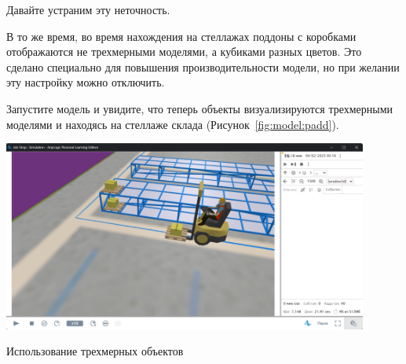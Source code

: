 Давайте устраним эту неточность.\par
В то же время, во время нахождения на стеллажах поддоны с коробками
отображаются не трехмерными моделями, а кубиками разных цветов. Это
сделано специально для повышения производительности модели, но при
желании эту настройку можно отключить.\par
Запустите модель и увидите, что теперь объекты визуализируются
трехмерными моделями и находясь на стеллаже склада
(Рисунок~\ref{fig:model:padd}).

\begin{image}
	\includegraphics[width=0.9\textwidth]{2023-04-02_15-28-11}
	\caption{Использование трехмерных объектов}
	\label{fig:model:padd}
\end{image}

